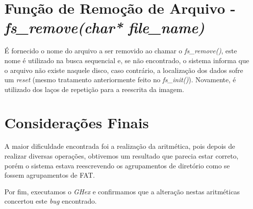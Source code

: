 \documentclass[11pt]{article}
\begin{document}
\section{Função de Remoção de Arquivo - \textit{fs\_remove(char* file\_name)}}
\par
É fornecido o nome do arquivo a ser removido ao chamar o \textit{fs\_remove()}, este nome é utilizado na busca sequencial e, se não encontrado, o sistema informa que o arquivo não existe naquele disco, caso contrário, a localização dos dados sofre um \textit{reset} (mesmo tratamento anteriormente feito no \textit{fs\_init()}). Novamente, é utilizado dos laços de repetição para a reescrita da imagem.


\section{Considerações Finais}
\par
A maior dificuldade encontrada foi a realização da aritmética, pois depois de realizar diversas operações, obtivemos um resultado que parecia estar correto, porém o sistema estava reescrevendo os agrupamentos de diretório como se fossem agrupamentos de FAT.
\par
Por fim, executamos o \textit{GHex} e confirmamos que a alteração nestas aritméticas concertou este \textit{bug} encontrado.
\end{document}
